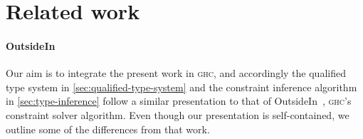 \documentclass[acmsmall,usenames,dvipsnames,natbib=false,acmthm=false,screen]{acmart}
\theoremstyle{acmplain}
\theoremstyle{acmdefinition}
\begin{document}




\section{Related work}
\label{sec:related-work}

\paragraph{OutsideIn}
\label{sec:outsidein}

Our aim is to integrate the present work in \textsc{ghc}, and
accordingly the qualified type system in
\cref{sec:qualified-type-system} and the constraint inference
algorithm in \cref{sec:type-inference} follow a similar
presentation to that of OutsideIn~\cite{OutsideIn}, \textsc{ghc}'s
constraint solver algorithm.  Even though our presentation is
self-contained, we outline some of the differences from that work.
\end{document}
